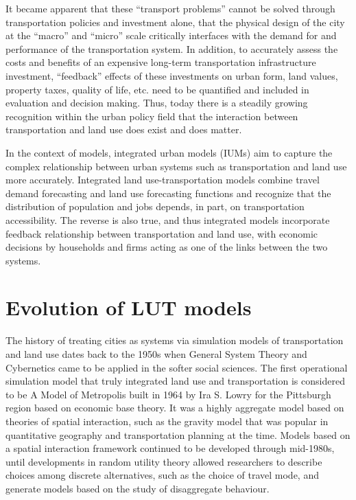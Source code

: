 It became apparent that these ``transport problems'' cannot be solved through transportation policies and investment alone, that the physical design of the city at the ``macro'' and ``micro'' scale critically interfaces with the demand for and performance of the transportation system.
In addition, to accurately assess the costs and benefits of an expensive long-term transportation infrastructure investment, ``feedback'' effects of these investments on urban form, land values, property taxes, quality of life, etc.
need to be quantified and included in evaluation and decision making.
Thus, today there is a steadily growing recognition within the urban policy field that the interaction between transportation and land use does exist and does matter\cite{Miller2018b}.

In the context of models, integrated urban models (IUMs) aim to capture the complex relationship between urban systems such as transportation and land use more accurately.
Integrated land use-transportation models combine travel demand forecasting and land use forecasting functions and recognize that the distribution of population and jobs depends, in part, on transportation accessibility.
The reverse is also true, and thus integrated models incorporate feedback relationship between transportation and land use, with economic decisions by households and firms acting as one of the links between the two systems\cite{Miller1998}.

\section{Evolution of LUT models} \label{sec:evolution_of_lut_models}

The history of treating cities as systems via simulation models of transportation and land use dates back to the 1950s when General System Theory and Cybernetics came to be applied in the softer social sciences\cite{Batty2008}.
The first operational simulation model that truly integrated land use and transportation is considered to be A Model of Metropolis built in 1964 by Ira S. Lowry for the Pittsburgh region based on economic base theory\cite{Lowry1964}.
It was a highly aggregate model based on theories of spatial interaction, such as the gravity model that was popular in quantitative geography and transportation planning at the time\cite{Bouchard1965}.
Models based on a spatial interaction framework continued to be developed through mid-1980s, until developments in random utility theory allowed researchers to describe choices among discrete alternatives, such as the choice of travel mode, and generate models based on the study of disaggregate behaviour\cite{Iacono2008}.

